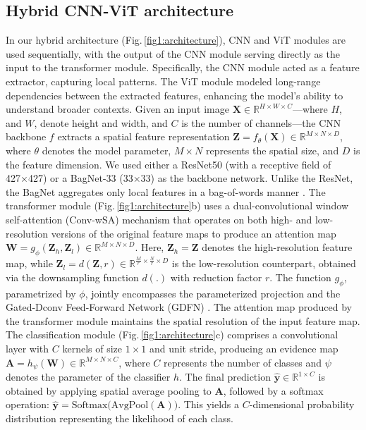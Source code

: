 \documentclass[runningheads]{llncs}
\begin{document}
        \subsection{Hybrid CNN-ViT architecture}
            \label{backbone}
            In our hybrid architecture (Fig.\,\ref{fig1:architecture}), CNN and ViT modules are used sequentially, with the output of the CNN module serving directly as the input to the transformer module. Specifically, the CNN module acted as a feature extractor, capturing local patterns. The ViT module modeled long-range dependencies between the extracted features, enhancing the model’s ability to understand broader contexts. 
            Given an input image $\textbf{X} \in \mathbb{R}^{H \times W \times C}$---where $H$, and $W$, denote height and width, and $C$ is the number of channels---the CNN backbone $f$ extracts a spatial feature representation $\mathbf{Z}=f_{\theta}(\mathbf{X}) \in \mathbb{R}^{M \times N \times D}$, where $\theta$ denotes the model parameter, $M \times N$ represents the spatial size, and $D$ is the feature dimension. We used either a ResNet50 (with a receptive field of 427×427) or a BagNet-33 (33×33) as the backbone network. Unlike the ResNet, the BagNet aggregates only local features in a bag-of-words manner \cite{brendel2018bagnets}.                  
            The transformer module (Fig.\,\ref{fig1:architecture}b) uses a dual-convolutional window self-attention (Conv-wSA) mechanism that operates on both high- and low-resolution versions of the original feature maps to produce an attention map $\mathbf{W} = g_{\phi}(\mathbf{Z}_{h}, \mathbf{Z}_{l}) \in \mathbb{R}^{M \times N \times D}$. 
            Here, $\mathbf{Z}_{h}=\mathbf{Z}$ denotes the high-resolution feature map, while $\mathbf{Z}_{l}=d(\mathbf{Z}, r) \in \mathbb{R}^{\frac{M}{r} \times \frac{N}{r} \times D}$ is the low-resolution counterpart, obtained via the downsampling function $d(.)$ with reduction factor $r$. The function $g_\phi$, parametrized by $\phi$,  jointly encompasses the parameterized projection and the Gated-Dconv Feed-Forward Network (GDFN) \cite{zamir2022restormer}. 
            The attention map produced by the transformer module maintains the spatial resolution of the input feature map.            
            The classification module (Fig.\,\ref{fig1:architecture}c) comprises a convolutional layer with $C$ kernels of size $1 \times 1$ and unit stride, producing an evidence map $\mathbf{A} = h_{\psi}(\mathbf{W}) \in \mathbb{R}^{M \times N \times C}$, where $C$ represents the number of classes and $\psi$ denotes the parameter of the classifier $h$. The final prediction $\mathbf{\hat{y}} \in \mathbb{R}^{1 \times C}$ is obtained by applying spatial average pooling to $\mathbf{A}$, followed by a softmax operation: $\mathbf{\hat{y}} = \mbox{Softmax} \big( \mbox{AvgPool}(\mathbf{A}) \big)$. This yields a $C$-dimensional probability distribution representing the likelihood of each class.
\end{document}
